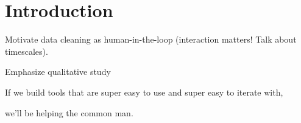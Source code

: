 \section{Introduction}
Motivate data cleaning as human-in-the-loop (interaction matters! Talk about timescales).

Emphasize qualitative study

If we build tools that are super easy to use and super easy to iterate with, 

we’ll be helping the common man.
